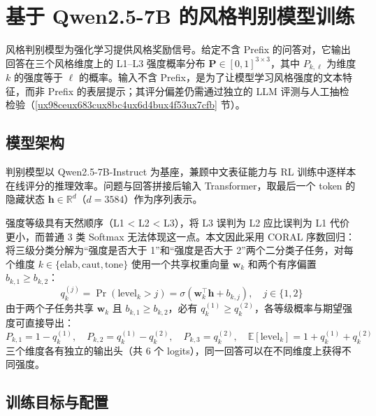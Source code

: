 \documentclass[fontset=fandol,type=master,campus=shenzhen,etitleauto=true]{hithesisbook}
\begin{document}
\section{基于 Qwen2.5-7B 的风格判别模型训练}\label{ux57faux4e8e-qwen2.5-7b-ux7684ux98ceux683cux5224ux522bux6a21ux578bux8badux7ec3}

风格判别模型为强化学习提供风格奖励信号。给定不含 Prefix 的问答对，它输出回答在三个风格维度上的 L1--L3 强度概率分布 $\mathbf{P} \in [0,1]^{3 \times 3}$，其中 $P_{k,\ell}$ 为维度 $k$ 的强度等于 $\ell$ 的概率。输入不含 Prefix，是为了让模型学习风格强度的文本特征，而非 Prefix 的表层提示；其评分偏差仍需通过独立的 LLM 评测与人工抽检检验（\ref{ux98ceux683cux8bc4ux6d4bux4f53ux7cfb} 节）。

\subsection{模型架构}\label{ux6a21ux578bux67b6ux6784ux8bbeux8ba1}

判别模型以 Qwen2.5-7B-Instruct 为基座，兼顾中文表征能力与 RL 训练中逐样本在线评分的推理效率。问题与回答拼接后输入 Transformer，取最后一个 token 的隐藏状态 $\mathbf{h} \in \mathbb{R}^{d}$（$d = 3584$）作为序列表示。

强度等级具有天然顺序（L1 < L2 < L3），将 L3 误判为 L2 应比误判为 L1 代价更小，而普通 3 类 Softmax 无法体现这一点。本文因此采用 CORAL 序数回归\cite{ref86}：将三级分类分解为“强度是否大于 1”和“强度是否大于 2”两个二分类子任务，对每个维度 $k \in \{\text{elab}, \text{caut}, \text{tone}\}$ 使用一个共享权重向量 $\mathbf{w}_k$ 和两个有序偏置 $b_{k,1} \ge b_{k,2}$：
\begin{equation}
q_k^{(j)} = \Pr(\text{level}_k > j) = \sigma\!\left(\mathbf{w}_k^{\top}\mathbf{h} + b_{k,j}\right), \quad j \in \{1, 2\}
\end{equation}
由于两个子任务共享 $\mathbf{w}_k$ 且 $b_{k,1} \ge b_{k,2}$，必有 $q_k^{(1)} \ge q_k^{(2)}$，各等级概率与期望强度可直接导出：
\begin{equation}
P_{k,1} = 1 - q_k^{(1)}, \quad P_{k,2} = q_k^{(1)} - q_k^{(2)}, \quad P_{k,3} = q_k^{(2)}, \quad \mathbb{E}[\text{level}_k] = 1 + q_k^{(1)} + q_k^{(2)}
\end{equation}
三个维度各有独立的输出头（共 6 个 logits），同一回答可以在不同维度上获得不同强度。

\subsection{训练目标与配置}\label{ux8badux7ec3ux76eeux6807ux4e0eux4f18ux5316ux914dux7f6e-1}
\end{document}
